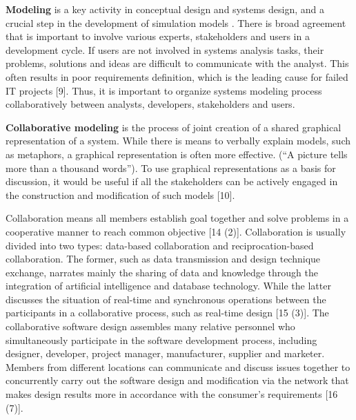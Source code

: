 
\textbf{Modeling} is a key activity in conceptual design and systems design, and a crucial step in the development of simulation models \cite{barjis2008importance,brooks2006some,robinson2008conceptual}. There is broad agreement that is important to involve various experts, stakeholders and users in a development cycle. If users are not involved in systems analysis tasks, their problems, solutions and ideas are difficult to communicate with the analyst. This often results in poor requirements definition, which is the leading cause for failed IT projects [9]. Thus, it is important to organize systems modeling process collaboratively between analysts, developers, stakeholders and users. 

\textbf{Collaborative modeling} is the process of joint creation of a shared graphical representation of a system. While there is means to verbally explain models, such as metaphors, a graphical representation is often more effective. (“A picture tells more than a thousand words”). To use graphical representations as a basis for discussion, it would be useful if all the stakeholders can be actively engaged in the construction and modification of such models [10]. 

Collaboration means all members establish goal together and solve problems in a cooperative manner to reach common objective [14 (2)]. Collaboration is usually divided into two types: data-based collaboration and reciprocation-based collaboration. The former, such as data transmission and design technique exchange, narrates mainly the sharing of data and knowledge through the integration of artificial intelligence and database technology. While the latter discusses the situation of real-time and synchronous operations between the participants in a collaborative process, such as real-time design [15 (3)]. The collaborative software design assembles many relative personnel who simultaneously participate in the software development process, including designer, developer, project manager, manufacturer, supplier and marketer. Members from different locations can communicate and discuss issues together to concurrently carry out the software design and modification via the network that makes design results more in accordance with the consumer’s requirements [16 (7)].

